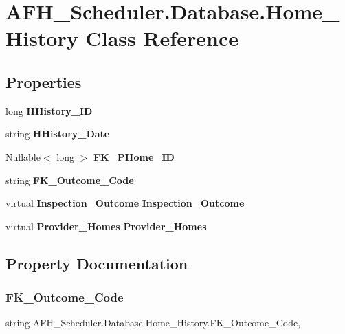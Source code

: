 \section{A\+F\+H\+\_\+\+Scheduler.\+Database.\+Home\+\_\+\+History Class Reference}
\label{class_a_f_h___scheduler_1_1_database_1_1_home___history}
\subsection*{Properties}
\begin{DoxyCompactItemize}
\item 
long \textbf{ H\+History\+\_\+\+ID}\hspace{0.3cm}{\ttfamily  [get, set]}
\item 
string \textbf{ H\+History\+\_\+\+Date}\hspace{0.3cm}{\ttfamily  [get, set]}
\item 
Nullable$<$ long $>$ \textbf{ F\+K\+\_\+\+P\+Home\+\_\+\+ID}\hspace{0.3cm}{\ttfamily  [get, set]}
\item 
string \textbf{ F\+K\+\_\+\+Outcome\+\_\+\+Code}\hspace{0.3cm}{\ttfamily  [get, set]}
\item 
virtual \textbf{ Inspection\+\_\+\+Outcome} \textbf{ Inspection\+\_\+\+Outcome}\hspace{0.3cm}{\ttfamily  [get, set]}
\item 
virtual \textbf{ Provider\+\_\+\+Homes} \textbf{ Provider\+\_\+\+Homes}\hspace{0.3cm}{\ttfamily  [get, set]}
\end{DoxyCompactItemize}


\subsection{Property Documentation}
\mbox{\label{class_a_f_h___scheduler_1_1_database_1_1_home___history_a74e28ce982820a39af9b61bff7c36a23}} 
\subsubsection{FK\_Outcome\_Code}
{\footnotesize\ttfamily string A\+F\+H\+\_\+\+Scheduler.\+Database.\+Home\+\_\+\+History.\+F\+K\+\_\+\+Outcome\+\_\+\+Code\hspace{0.3cm}{\ttfamily [get]}, {\ttfamily [set]}}

